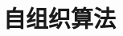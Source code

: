     
                
    
           
    
    
    
    
                  
        \clearpage
    \section{自组织算法}

